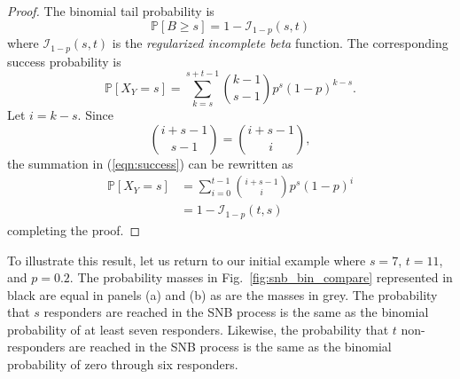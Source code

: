 \documentclass[review]{elsarticle}
\begin{document}
\begin{proof}
The binomial tail probability is
\begin{equation*}
\mathbb{P}[B \geq s] = 1 - \mathcal{I}_{1-p}(s, t)
\end{equation*}
where $\mathcal{I}_{1-p}(s, t)$ is the {\em regularized incomplete beta} 
function. The corresponding success probability is
\begin{equation} \label{eqn:success}
\mathbb{P} [X_Y = s] 
  = \sum_{k=s}^{s+t-1} {k-1 \choose s-1} p^s (1-p)^{k-s}.
\end{equation}
Let $i=k-s$. Since
\begin{equation*}
{i+s-1 \choose s-1} = {i+s-1 \choose i},
\end{equation*}
the summation in (\ref{eqn:success}) can be rewritten as
\begin{align*}
\mathbb{P} [X_Y = s] &= \sum_{i=0}^{t-1} {i+s-1 \choose i} p^s (1-p)^i\\
  &= 1 - \mathcal{I}_{1-p}(t, s)
\end{align*}
completing the proof.
\end{proof}

To illustrate this result, let us return to our initial example
where $s=7$, $t=11$, and $p=0.2$.  The probability masses in
Fig.~\ref{fig:snb_bin_compare} represented in 
black are equal in panels (a) and (b) as are the masses in grey.
The probability that $s$
responders are reached in the SNB process is the same as the binomial 
probability of at least seven responders. Likewise, the probability that $t$ 
non-responders are reached in the SNB process is the same as the binomial
probability of zero through six responders.
\end{document}
